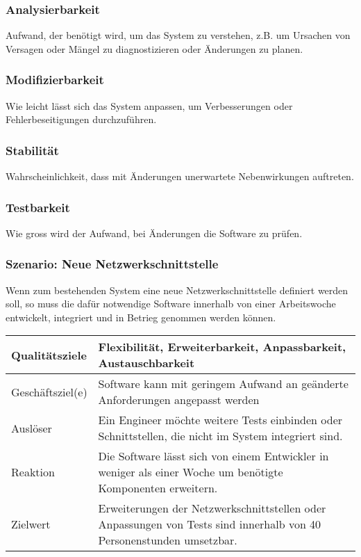 \documentclass[
	ngerman,
	toc=listof, %
	toc=bibliography, %
	footnotes=multiple, %
	parskip=half, %
	numbers=noendperiod %
]{scrartcl}
\begin{document}
		\subsubsection{Analysierbarkeit}
			Aufwand, der benötigt wird, um das System zu verstehen, z.B. um Ursachen von Versagen oder Mängel zu diagnostizieren oder Änderungen zu planen.

		\subsubsection{Modifizierbarkeit}
			Wie leicht lässt sich das System anpassen, um Verbesserungen oder Fehlerbeseitigungen durchzuführen.

		\subsubsection{Stabilität}
			Wahrscheinlichkeit, dass mit Änderungen unerwartete Nebenwirkungen auftreten.

		\subsubsection{Testbarkeit}
			Wie gross wird der Aufwand, bei Änderungen die Software zu prüfen.

		\subsubsection{Szenario: Neue Netzwerkschnittstelle}
			Wenn zum bestehenden System eine neue Netzwerkschnittstelle definiert werden soll, so muss die dafür notwendige Software innerhalb von einer Arbeitswoche entwickelt, integriert und in Betrieg genommen werden können.

			\begin{tabularx}{\textwidth}{lX}
				\toprule
				Qualitätsziele & Flexibilität, Erweiterbarkeit, Anpassbarkeit, Austauschbarkeit  \\
				\midrule
				Geschäftsziel(e) & Software kann mit geringem Aufwand an geänderte Anforderungen angepasst werden  \\
				\midrule
				Auslöser & Ein Engineer möchte weitere Tests einbinden oder Schnittstellen, die nicht im System integriert sind.  \\
				\midrule
				Reaktion & Die Software lässt sich von einem Entwickler in weniger als einer Woche um benötigte Komponenten erweitern.  \\
				\midrule
				Zielwert & 	Erweiterungen der Netzwerkschnittstellen oder Anpassungen von Tests sind innerhalb von 40 Personenstunden umsetzbar.  \\
				\bottomrule
			\end{tabularx}
\end{document}
